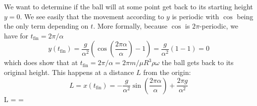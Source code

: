 We want to determine if the ball will at some point get back to its starting height $y = 0$. We see easily that the movement according to $y$ is periodic with $\cos$ being the only term depending on $t$. More formally, because $\cos$ is $2\pi$-periodic, we have for $t_\mathrm{fin} = 2\pi / \alpha$
\[ y(t_\mathrm{fin}) = \frac{g}{\alpha^2}\left(\cos\left(\frac{2\pi \alpha}{\alpha}\right) - 1\right) = \frac{g}{\alpha^2}(1 - 1) = 0 \]
which does show that at $t_\mathrm{fin} = 2\pi / \alpha = 2\pi m / \mu R^3\rho\omega$ the ball gets back to its original height. This happens at a distance $L$ from the origin:
\[
    L = x(t_\mathrm{fin}) = -\frac{g}{\alpha^2}\sin\left(\frac{2\pi \alpha}{\alpha}\right) + \frac{2\pi g}{\alpha^2}
\]
\be
    L =  = 
\ee
